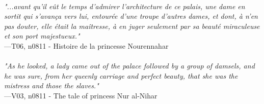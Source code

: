 \documentclass[../Carre_nights.tex]{subfiles}
\begin{document}
\textit{\\
"...avant qu’il eût le temps d’admirer l’architecture de ce palais, une dame en sortit qui s’avança vers lui, entourée d’une troupe d’autres dames, et dont, à n’en pas douter, elle était la maîtresse, à en juger seulement par sa beauté miraculeuse et son port majestueux."} \\
—T06, n0811 - Histoire de la princesse Nourennahar \\~\\
\textit{"As he looked, a lady came out of the palace followed by a group of damsels, and he was sure, from her queenly carriage and perfect beauty, that she was the mistress and those the slaves."} \\
—V03, n0811 - The tale of princess Nur al-Nihar
\end{document}
